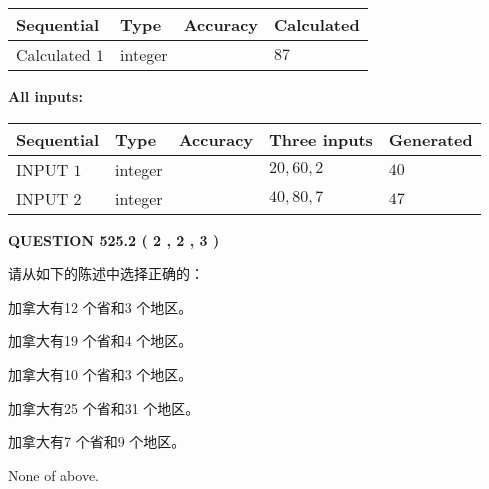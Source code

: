 \documentclass{ctexart}
\begin{document}
   
   
   
\noindent{}
   
   
  
  
\noindent\begin{tabular}{|l|l|l|l|}
\hline
 Sequential & Type & Accuracy & Calculated \\ 
\hline
 
 
  Calculated $  1 $ & integer &  & 
  $ 87 $ 
 \\  \hline  
 \end{tabular}
   
   
   
   
\noindent\vspace{0.1in}\hspace{-0.08in} {\textbf{\Large{All inputs: }}}
   
   
  
  
\noindent\begin{tabular}{|l|l|l|l|l|}
\hline
 Sequential & Type & Accuracy & Three inputs & Generated \\ 
\hline
 
 
  INPUT $  1 $ & integer &  & $
 20
 , 
 60
 , 
 2
 $ & $ 40 $ 
 \\  \hline  
 
 
  INPUT $  2 $ & integer &  & $
 40
 , 
 80
 , 
 7
 $ & $ 47 $ 
 \\  \hline  
 \end{tabular}
   
   
  
\vspace{0.2in}
  
{\textbf{\Large{QUESTION
525.2 
 ( 2 , 2 , 3 )
}}}
  
  
请从如下的陈述中选择正确的：
 
 
加拿大有12 个省和3 个地区。
 
 
加拿大有19 个省和4 个地区。
 
 
加拿大有10 个省和3 个地区。
 
 
加拿大有25 个省和31 个地区。
 
 
加拿大有7 个省和9 个地区。
 
 
 None of above.
 
 
\noindent{}
 
\end{document}
